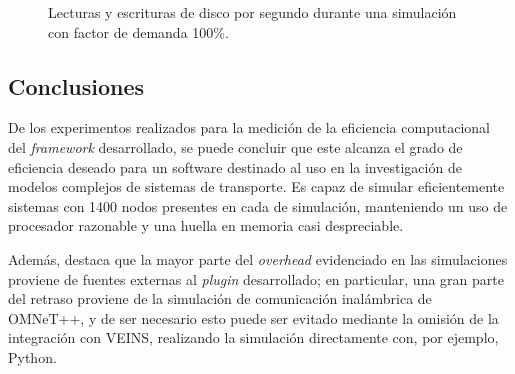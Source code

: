 \begin{figure}[htpb]
    \centering
    
    \caption[I/O en disco durante simulación]{Lecturas y escrituras de disco por segundo durante una simulación con factor de demanda 100\%.}
    \label{fig:systemload:io}
\end{figure} 

\subsection{Conclusiones}

De los experimentos realizados para la medición de la eficiencia computacional del \emph{framework} desarrollado, se puede concluir que este alcanza el grado de eficiencia deseado para un software destinado al uso en la investigación de modelos complejos de sistemas de transporte. Es capaz de simular eficientemente sistemas con 1400 nodos presentes en cada de simulación, manteniendo un uso de procesador razonable y una huella en memoria casi despreciable. 

Además, destaca que la mayor parte del \emph{overhead} evidenciado en las simulaciones proviene de fuentes externas al \emph{plugin} desarrollado; en particular, una gran parte del retraso proviene de la simulación de comunicación inalámbrica de OMNeT++, y de ser necesario esto puede ser evitado mediante la omisión de la integración con VEINS, realizando la simulación directamente con, por ejemplo, Python.
